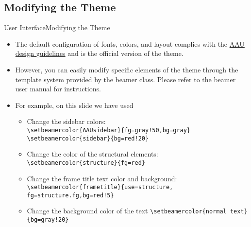 \documentclass[10pt]{beamer}
\newcommand{\chref}[2]{%
  \href{#1}{{\usebeamercolor[bg]{AAUsidebar}#2}}%
}
\begin{document}
\subsection{Modifying the Theme}
{
\begin{frame}{User Interface}{Modifying the Theme}
  \begin{itemize}
    \item<1-> The default configuration of fonts, colors, and layout complies with the \chref{http://aau.designguiden.dk}{AAU design guidelines} and is the \alert{official} version of the theme.
    \item<2-> However, you can easily modify specific elements of the theme through the template system provided by the beamer class. Please refer to the beamer user manual for instructions.
    \item<3-> For example, on this slide we have used
      \begin{itemize}
        \item Change the sidebar colors:\\
        {\tt \textbackslash setbeamercolor\{AAUsidebar\}\{fg=gray!50,bg=gray\}}
        {\tt \textbackslash setbeamercolor\{sidebar\}\{bg=red!20\}}
        \item Change the color of the structural elements:\\
        {\tt \textbackslash setbeamercolor\{structure\}\{fg=red\}}\\
        \item Change the frame title text color and background:
        {\tt \textbackslash setbeamercolor\{frametitle\}\{use=structure, fg=structure.fg,bg=red!5\}}
        \item Change the background color of the text
        {\tt \textbackslash setbeamercolor\{normal text\}\{bg=gray!20\}}
      \end{itemize}
  \end{itemize}
\end{frame}}
\end{document}
